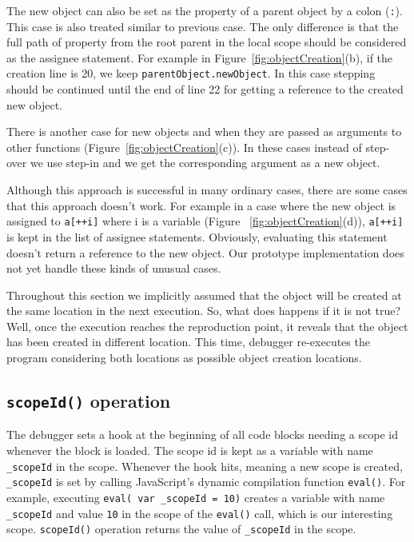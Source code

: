 \documentclass[preprint]{sigplanconf}
\begin{document}
The new object can also be set as the property of a parent object by a
colon (\texttt{:}). This case is also treated similar to previous case. The
only difference is that the full path of property from the root parent
in the local scope should be considered as the assignee statement. For
example in Figure~\ref{fig:objectCreation}(b), if the creation line
is 20, we keep \texttt{parentObject.newObject}. In this case stepping
should be continued until the end of line 22 for getting a reference
to the created new object.

There is another case for new objects and when they are passed as
arguments to other functions (Figure~\ref{fig:objectCreation}(c)). In these
cases instead of step-over we use step-in and we get the corresponding
argument as a new object.

Although this approach is successful in many ordinary cases, there are some 
cases that this approach doesn't work. For example in a case
where the new object is assigned to \texttt{a[++i]} where i is a variable
(Figure ~\ref{fig:objectCreation}(d)), \texttt{a[++i]} is kept in the list
of assignee statements. Obviously, evaluating this statement doesn't return
a reference to the new object. Our prototype implementation does not yet handle these kinds of unusual cases.

Throughout this section we implicitly assumed that the object will be created at 
the same location in the next execution. So, what does happens if it
is not true? Well, once the execution reaches the reproduction point, it
reveals that the object has been created in different location. This time,
debugger re-executes the program considering both locations as possible 
object creation locations.


\subsection{\texttt{scopeId()} operation}
The debugger sets a hook at the beginning of all code blocks needing
a scope id whenever the block is loaded. The scope id is kept as a variable with name 
\texttt{\_scopeId} in the scope. Whenever the hook hits,  meaning a new scope
is created, \texttt{\_scopeId} is set by calling JavaScript's dynamic compilation 
function \texttt{eval()}. For example, executing \texttt{eval( var \_scopeId = 10)} creates a
variable with name \texttt{\_scopeId} and value \texttt{10} in the
scope of the \texttt{eval()} call, which is our interesting scope. \texttt{scopeId()}
operation returns the value of \texttt{\_scopeId} in the scope.
\end{document}
